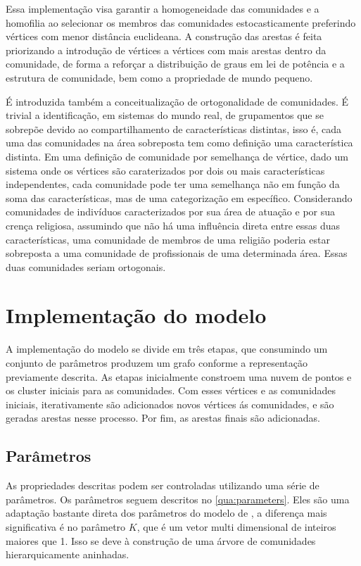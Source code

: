 \documentclass[notes.tex]{subfiles}
\begin{document}
Essa implementação visa garantir a homogeneidade das comunidades e a homofilia ao selecionar os membros das comunidades estocasticamente preferindo vértices com menor distância euclideana.
A construção das arestas é feita priorizando a introdução de vértices a vértices com mais arestas dentro da comunidade, de forma a reforçar a distribuição de graus em lei de potência e a estrutura de comunidade, bem como a propriedade de mundo pequeno.

É introduzida também a conceitualização de ortogonalidade de comunidades.
É trivial a identificação, em sistemas do mundo real, de grupamentos que se sobrepõe devido ao compartilhamento de características distintas, isso é, cada uma das comunidades na área sobreposta tem como definição uma característica distinta.
Em uma definição de comunidade por semelhança de vértice, dado um sistema onde os vértices são caraterizados por dois ou mais características independentes, cada comunidade pode ter uma semelhança não em função da soma das características, mas de uma categorização em específico.
Considerando comunidades de indivíduos caracterizados por sua área de atuação e por sua crença religiosa, assumindo que não há uma influência direta entre essas duas características, uma comunidade de membros de uma religião poderia estar sobreposta a uma comunidade de profissionais de uma determinada área.
Essas duas comunidades seriam ortogonais.

\section{Implementação do modelo}

A implementação do modelo se divide em três etapas, que consumindo um conjunto de parâmetros produzem um grafo conforme a representação previamente descrita.
As etapas inicialmente constroem uma nuvem de pontos e os cluster iniciais para as comunidades.
Com esses vértices e as comunidades iniciais, iterativamente são adicionados novos vértices ás comunidades, e são geradas arestas nesse processo.
Por fim, as arestas finais são adicionadas.

\subsection{Parâmetros}

As propriedades descritas podem ser controladas utilizando uma série de parâmetros.
Os parâmetros seguem descritos no \autoref{qua:parameters}.
Eles são uma adaptação bastante direta dos parâmetros do modelo de , a diferença mais significativa é no parâmetro $K$, que é um vetor multi dimensional de inteiros maiores que 1.
Isso se deve à construção de uma árvore de comunidades hierarquicamente aninhadas.
\end{document}
